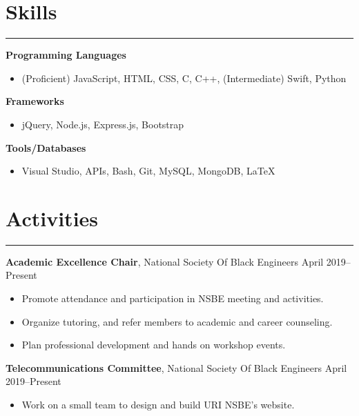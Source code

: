 \documentclass[11pt]{article}
\newcommand{\resumesection}[1]{\vspace{-0.2cm}\section*{#1}\vspace{-0.2cm}\hrule\vspace{0.2cm}}
\begin{document}
\resumesection{Skills}

\textbf{Programming Languages}
\begin{itemize}
	\item (Proficient) JavaScript, HTML, CSS, C, C++, (Intermediate) Swift, Python 
\end{itemize}

\textbf{Frameworks}
\begin{itemize}
	\item jQuery, Node.js, Express.js, Bootstrap
\end{itemize}

\textbf{Tools/Databases}
\begin{itemize}
	\item Visual Studio, APIs, Bash, Git, MySQL, MongoDB, \LaTeX
\end{itemize}

\resumesection{Activities}

\textbf{Academic Excellence Chair}, National Society Of Black Engineers \hfill April 2019--Present
\begin{itemize}
	\item Promote attendance and participation in NSBE meeting and activities.
	\item Organize tutoring, and refer members to academic and career counseling.
	\item Plan professional development and hands on workshop events.
\end{itemize}

\textbf{Telecommunications Committee}, National Society Of Black Engineers \hfill April 2019--Present
\begin{itemize}
	\item Work on a small team to design and build URI NSBE's website.
\end{itemize}
\end{document}
